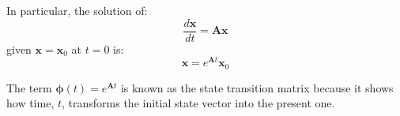 In particular, the solution of:
\[
\frac{d\mathbf{x}}{dt}=\mathbf{Ax}
\]
given $\mathbf{x}=\mathbf{x}_0$ at $t=0$ is:
\[
\mathbf{x}=e^{\mathbf{A}t}\mathbf{x}_0
\]
               
The term  $\mathbf{\phi}(t) = e^{\mathbf{A}t}$  is known as the state transition matrix because it shows how time, $t$, transforms the initial state vector into the present one.

\endinput

